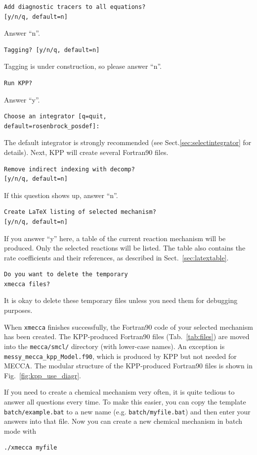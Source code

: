 \documentclass[twoside]{article}
\begin{document}
\begin{verbatim}
Add diagnostic tracers to all equations?
[y/n/q, default=n]
\end{verbatim}
Answer ``n''.
\begin{verbatim}
Tagging? [y/n/q, default=n]
\end{verbatim}
Tagging is under construction, so please answer ``n''.
\begin{verbatim}
Run KPP?
\end{verbatim}
Answer ``y''.
\begin{verbatim}
Choose an integrator [q=quit,
default=rosenbrock_posdef]:
\end{verbatim}
The default integrator is strongly recommended (see
Sect.\ref{sec:selectintegrator} for details). Next, KPP will create
several Fortran90 files.
\begin{verbatim}
Remove indirect indexing with decomp?
[y/n/q, default=n]
\end{verbatim}
If this question shows up, answer ``n''.
\begin{verbatim}
Create LaTeX listing of selected mechanism?
[y/n/q, default=n]
\end{verbatim}
If you answer ``y'' here, a table of the current reaction mechanism will
be produced. Only the selected reactions will be listed. The table also
contains the rate coefficients and their references, as described in
Sect.~\ref{sec:latextable}.
\begin{verbatim}
Do you want to delete the temporary
xmecca files?
\end{verbatim}
It is okay to delete these temporary files unless you need them for
debugging purposes.

When \verb|xmecca| finishes successfully, the Fortran90 code of your
selected mechanism has been created. The KPP-produced Fortran90 files
(Tab.~\ref{tab:files}) are moved into the \verb|mecca/smcl/| directory
(with lower-case names). An exception is
\verb|messy_mecca_kpp_Model.f90|, which is produced by KPP but not
needed for MECCA. The modular structure of the KPP-produced Fortran90
files is shown in Fig.~\ref{fig:kpp_use_diagr}.

If you need to create a chemical mechanism very often, it is quite
tedious to answer all questions every time. To make this easier, you can
copy the template \verb|batch/example.bat| to a new name (e.g.
\verb|batch/myfile.bat|) and then enter your answers into that file. Now
you can create a new chemical mechanism in batch mode with
\begin{verbatim}
./xmecca myfile
\end{verbatim}
\end{document}
